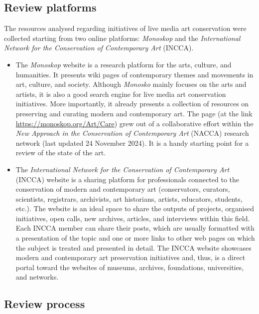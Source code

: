 \subsection{Review platforms}
The resources analysed regarding initiatives of live media art conservation were collected starting from two online platforms: \textit{Monoskop} and the \textit{International Network for the Conservation of Contemporary Art} (INCCA).
\begin{itemize}
    \item The \textit{Monoskop} website is a research platform for the arts, culture, and humanities. It presents wiki pages of contemporary themes and movements in art, culture, and society. Although \textit{Monosko} mainly focuses on the arts and artists, it is also a good search engine for live media art conservation initiatives. More importantly, it already presents a collection of resources on preserving and curating modern and contemporary art. The page (at the link \url{https://monoskop.org/Art/Care}) grew out of a collaborative effort within the \textit{New Approach in the Conservation of Contemporary Art} (NACCA) research network (last updated 24 November 2024). It is a handy starting point for a review of the state of the art.
    \item The \textit{International Network for the Conservation of Contemporary Art} (INCCA) website is a sharing platform for professionals connected to the conservation of modern and contemporary art (conservators, curators, scientists, registrars, archivists, art historians, artists, educators, students, etc.). The website is an ideal space to share the outputs of projects, organised initiatives, open calls, new archives, articles, and interviews within this field. Each INCCA member can share their posts, which are usually formatted with a presentation of the topic and one or more links to other web pages on which the subject is treated and presented in detail. The INCCA website showcases modern and contemporary art preservation initiatives and, thus, is a direct portal toward the websites of museums, archives, foundations, universities, and networks. 
\end{itemize}

\subsection{Review process}
